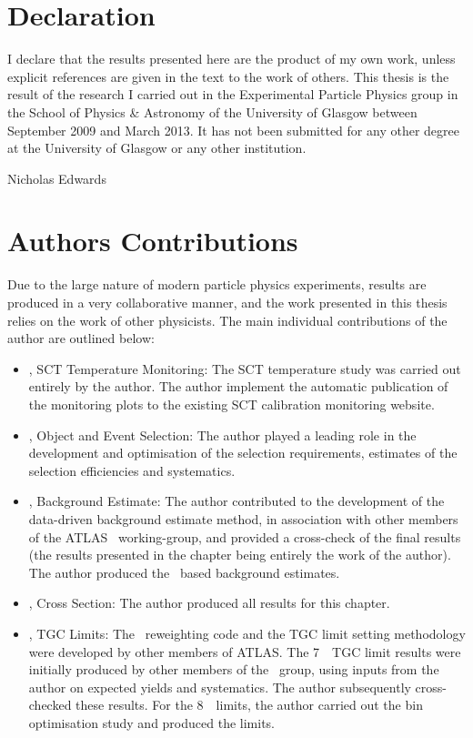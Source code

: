 \chapter*{Declaration}
I declare that the results presented here are the product of my own work, unless
explicit references are given in the text to the work of others. This thesis is
the result of the research I carried out in the Experimental Particle Physics
group in the School of Physics \& Astronomy of the University of Glasgow between
September 2009 and March 2013. It has not been submitted for any other degree
at the University of Glasgow or any other institution.

\hfill Nicholas Edwards

\chapter*{Authors Contributions}

Due to the large nature of modern particle physics experiments, results are produced in a very collaborative
manner, and the work presented in this thesis relies on the work of other
physicists. The main individual contributions of the author are outlined below:

\begin{itemize}

\item {}, SCT Temperature Monitoring: The SCT temperature study was
carried out entirely by the author. The author implement the automatic
publication of the monitoring plots to the existing SCT calibration monitoring
website.

\item {}, Object and Event Selection: The author played a
leading role in the development and optimisation of the selection requirements,
estimates of the selection efficiencies and systematics.

\item {}, Background Estimate: The author contributed to the 
development of the data-driven background estimate method, in association with other members
of the ATLAS \ZZ\ working-group, and provided a cross-check of the final
results (the results presented in the chapter being entirely the work of the
author). The author produced the \mc\ based background estimates.

\item {}, Cross Section: The author produced all results for
this chapter.

\item {}, TGC Limits: The \AfterBurner\ reweighting code and the TGC
limit setting methodology were developed by other members of 
ATLAS. The 7~\tev\ TGC limit results were initially produced by
other members of the \ZZ\ group, using inputs from the author on expected
yields and systematics. The author subsequently cross-checked these results. For
the 8~\tev\ limits, the author carried out the bin optimisation study and
produced the limits.

\end{itemize}
